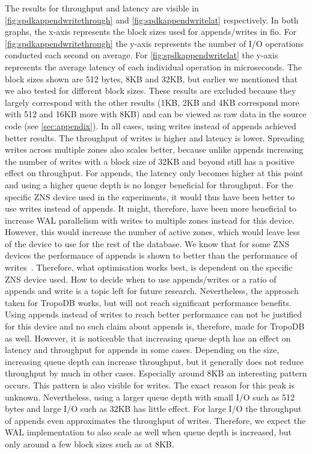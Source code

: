 The results for throughput and latency are visible in \autoref{fig:spdkappendwritethrough} and \autoref{fig:spdkappendwritelat} respectively. In both graphs, the x-axis represents the block sizes used for appends/writes in fio. For \autoref{fig:spdkappendwritethrough} the y-axis represents the number of I/O operations conducted each second on average. For \autoref{fig:spdkappendwritelat} the y-axis represents the average latency of each individual operation in microseconds. The block sizes shown are 512 bytes, 8KB and 32KB, but earlier we mentioned that we also tested for different block sizes. These results are excluded because they largely correspond with the other results (1KB, 2KB and 4KB correspond more with 512 and 16KB more with 8KB) and can be viewed as raw data in the source code (see \autoref{sec:appendix}). In all cases, using writes instead of appends achieved better results. The throughput of writes is higher and latency is lower. Spreading writes across multiple zones also scales better, because unlike appends increasing the number of writes with a block size of 32KB and beyond still has a positive effect on throughput. For appends, the latency only becomes higher at this point and using a higher queue depth is no longer beneficial for throughput. For the specific ZNS device used in the experiments, it would thus have been better to use writes instead of appends. It might, therefore, have been more beneficial to increase WAL parallelism with writes to multiple zones instead for this device. However, this would increase the number of active zones, which would leave less of the device to use for the rest of the database. We know that for some ZNS devices the performance of appends is shown to better than the performance of writes~\cite{bjorling2020zone}. Therefore, what optimisation works best, is dependent on the specific ZNS device used. How to decide when to use appends/writes or a ratio of appends and write is a topic left for future research. Nevertheless, the approach taken for TropoDB works, but will not reach significant performance benefits. Using appends instead of writes to reach better performance can not be justified for this device and no such claim about appends is, therefore, made for TropoDB as well. However, it is noticeable that increasing queue depth has an effect on latency and throughput for appends in some cases. Depending on the size, increasing queue depth can increase throughput, but it generally does not reduce throughput by much in other cases. Especially around 8KB an interesting pattern occurs. This pattern is also visible for writes. The exact reason for this peak is unknown. Nevertheless, using a larger queue depth with small I/O such as 512 bytes and large I/O such as 32KB has little effect.  For large I/O the throughput of appends even approximates the throughput of writes. Therefore, we expect the WAL implementation to also scale as well when queue depth is increased, but only around a few block sizes such as at 8KB. 


